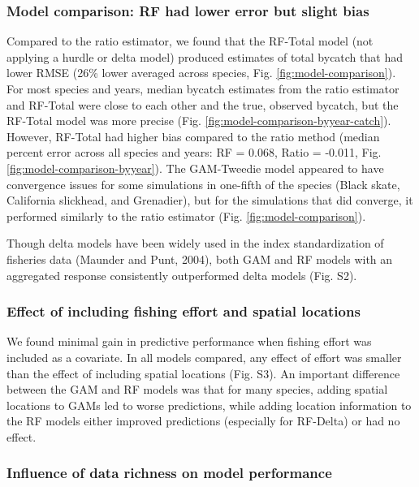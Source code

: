 \documentclass[]{article}
\begin{document}
\hypertarget{model-comparison-rf-had-lower-error-but-slight-bias}{%
\subsubsection{Model comparison: RF had lower error but slight
bias}\label{model-comparison-rf-had-lower-error-but-slight-bias}}

Compared to the ratio estimator, we found that the RF-Total model (not
applying a hurdle or delta model) produced estimates of total bycatch
that had lower RMSE (26\% lower averaged across species, Fig.
\ref{fig:model-comparison}). For most species and years, median bycatch
estimates from the ratio estimator and RF-Total were close to each other
and the true, observed bycatch, but the RF-Total model was more precise
(Fig. \ref{fig:model-comparison-byyear-catch}). However, RF-Total had
higher bias compared to the ratio method (median percent error across
all species and years: RF = 0.068, Ratio = -0.011, Fig.
\ref{fig:model-comparison-byyear}). The GAM-Tweedie model appeared to
have convergence issues for some simulations in one-fifth of the species
(Black skate, California slickhead, and Grenadier), but for the
simulations that did converge, it performed similarly to the ratio
estimator (Fig. \ref{fig:model-comparison}).

Though delta models have been widely used in the index standardization
of fisheries data (Maunder and Punt, 2004), both GAM and RF models with
an aggregated response consistently outperformed delta models (Fig. S2).

\hypertarget{effect-of-including-fishing-effort-and-spatial-locations}{%
\subsubsection{Effect of including fishing effort and spatial
locations}\label{effect-of-including-fishing-effort-and-spatial-locations}}

We found minimal gain in predictive performance when fishing effort was
included as a covariate. In all models compared, any effect of effort
was smaller than the effect of including spatial locations (Fig. S3). An
important difference between the GAM and RF models was that for many
species, adding spatial locations to GAMs led to worse predictions,
while adding location information to the RF models either improved
predictions (especially for RF-Delta) or had no effect.

\hypertarget{influence-of-data-richness-on-model-performance}{%
\subsubsection{Influence of data richness on model
performance}\label{influence-of-data-richness-on-model-performance}}
\end{document}
